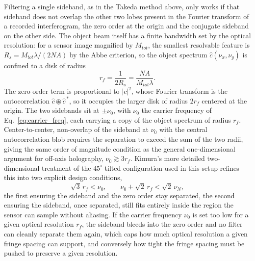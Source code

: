 Filtering a single sideband, as in the Takeda method above, only works if that sideband does not overlap the other two lobes present in the Fourier transform of a recorded interferogram, the zero order at the origin and the conjugate sideband on the other side. The object beam itself has a finite bandwidth set by the optical resolution: for a sensor image magnified by $M_{tot}$, the smallest resolvable feature is $R_s=M_{tot}\lambda/(2NA)$ by the Abbe criterion, so the object spectrum $\hat{c}(\nu_x,\nu_y)$ is confined to a disk of radius
\begin{equation}
r_f = \frac{1}{2R_s} = \frac{NA}{M_{tot}\lambda}.
\end{equation}
The zero order term is proportional to $|c|^2$, whose Fourier transform is the autocorrelation $\hat{c}\circledast\hat{c}^{\,*}$, so it occupies the larger disk of radius $2r_f$ centered at the origin. The two sidebands sit at $\pm\nu_0$, with $\nu_0$ the carrier frequency of Eq.~\eqref{eq:carrier_freq}, each carrying a copy of the object spectrum of radius $r_f$. Center-to-center, non-overlap of the sideband at $\nu_0$ with the central autocorrelation blob requires the separation to exceed the sum of the two radii, giving the same order of magnitude condition as the general one-dimensional argument for off-axis holography, $\nu_0 \gtrsim 3r_f$. Kimura's more detailed two-dimensional treatment of the $45^{\circ}$-tilted configuration used in this setup refines this into two explicit design conditions,
\begin{equation}
\sqrt{3}\,r_f < \nu_0, \qquad \nu_0+\sqrt{2}\,r_f < \sqrt{2}\,\nu_N,
\end{equation}
the first ensuring the sideband and the zero order stay separated, the second ensuring the sideband, once separated, still fits entirely inside the region the sensor can sample without aliasing. If the carrier frequency $\nu_0$ is set too low for a given optical resolution $r_f$, the sideband bleeds into the zero order and no filter can cleanly separate them again, which caps how much optical resolution a given fringe spacing can support, and conversely how tight the fringe spacing must be pushed to preserve a given resolution.

